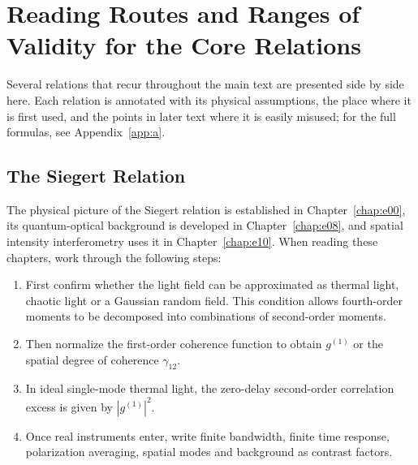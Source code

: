 \chapter{Reading Routes and Ranges of Validity for the Core Relations}
\label{app:d}

Several relations that recur throughout the main text are presented side by side here. Each relation is annotated with its physical assumptions, the place where it is first used, and the points in later text where it is easily misused; for the full formulas, see Appendix~\ref{app:a}.

\section{The Siegert Relation}
\label{appsec:d-siegert}

The physical picture of the Siegert relation is established in Chapter~\ref{chap:e00}, its quantum-optical background is developed in Chapter~\ref{chap:e08}, and spatial intensity interferometry uses it in Chapter~\ref{chap:e10}. When reading these chapters, work through the following steps:

\begin{enumerate}[leftmargin=*]
\item First confirm whether the light field can be approximated as thermal light, chaotic light or a Gaussian random field. This condition allows fourth-order moments to be decomposed into combinations of second-order moments.
\item Then normalize the first-order coherence function to obtain \(g^{(1)}\) or the spatial degree of coherence \(\gamma_{12}\).
\item In ideal single-mode thermal light, the zero-delay second-order correlation excess is given by \(|g^{(1)}|^2\).
\item Once real instruments enter, write finite bandwidth, finite time response, polarization averaging, spatial modes and background as contrast factors.
\end{enumerate}

